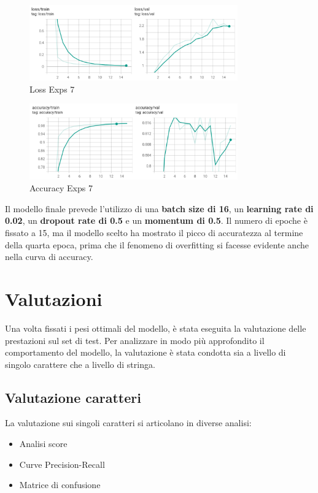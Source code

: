 \begin{figure}[htbp]
    \centering
    \includegraphics[width=0.8\textwidth]{images/exps7_loss.png}
    \caption{Loss Exps 7}
    \label{fig:exps7_loss}
\end{figure}

\begin{figure}[htbp]
    \centering
    \includegraphics[width=0.8\textwidth]{images/exps7_accuracy.png}
    \caption{Accuracy Exps 7}
    \label{fig:exps7_acc}
\end{figure}



Il modello finale prevede l'utilizzo di una \textbf{batch size di 16}, un \textbf{learning rate di 0.02}, un \textbf{dropout rate di 0.5} e un \textbf{momentum di 0.5}. Il numero di epoche è fissato a 15, ma il modello scelto ha mostrato il picco di accuratezza al termine della quarta epoca, prima che il fenomeno di overfitting si facesse evidente anche nella curva di accuracy.

\section{Valutazioni}
\label{sec:valutazioni}
Una volta fissati i pesi ottimali del modello, è stata eseguita la valutazione delle prestazioni sul set di test. Per analizzare in modo più approfondito il comportamento del modello, la valutazione è stata condotta sia a livello di singolo carattere che a livello di stringa.

\subsection{Valutazione caratteri}
La valutazione sui singoli caratteri si articolano in diverse analisi:
\begin{itemize}
    \item Analisi score
    \item Curve Precision-Recall
    \item Matrice di confusione
\end{itemize}

